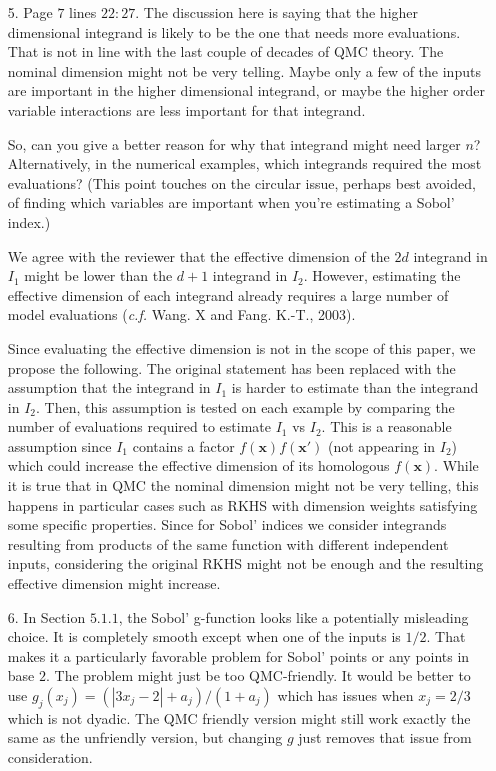\documentclass[10pt,a4paper]{article}
\newcommand{\vect}[1]{\boldsymbol{\mathbf{#1}}}
\newcommand{\vx}{\vect{x}}
\begin{document}
\begin{itemize}
\item[5.] Page $7$ lines $22:27$. The discussion here is saying that the higher dimensional integrand is likely to be the one that needs more evaluations. That is not in line with the last couple of decades of QMC theory. The nominal dimension might not be very telling. Maybe only a few of the inputs are important in the higher dimensional integrand, or maybe the higher order variable interactions are less important for that integrand.

So, can you give a better reason for why that integrand might need larger $n$? Alternatively, in the numerical examples, which integrands required the most evaluations?
(This point touches on the circular issue, perhaps best avoided, of finding which variables are important when you're estimating a Sobol' index.)

{\color{blue} We agree with the reviewer that the effective dimension of the $2d$ integrand in $I_1$ might be lower than the $d+1$ integrand in $I_2$. However, estimating the effective dimension of each integrand already requires a large number of model evaluations (\textit{c.f.} Wang. X and Fang. K.-T., 2003).

Since evaluating the effective dimension is not in the scope of this paper, we propose the following. The original statement has been replaced with the assumption that the integrand in $I_1$ is harder to estimate than the integrand in $I_2$. Then, this assumption is tested on each example by comparing the number of evaluations required to estimate $I_1$ vs $I_2$. This is a reasonable assumption since $I_1$ contains a factor $f(\vx)f(\vx')$ (not appearing in $I_2$) which could increase the effective dimension of its homologous $f(\vx)$. While it is true that in QMC the nominal dimension might not be very telling, this happens in particular cases such as RKHS with dimension weights satisfying some specific properties. Since for Sobol' indices we consider integrands resulting from products of the same function with different independent inputs, considering the original RKHS might not be enough and the resulting effective dimension might increase.}


\item[6.] In Section $5.1.1$, the Sobol' g-function looks like a potentially misleading choice. It is completely smooth except when one of the inputs is $1/2$.
That makes it a particularly favorable problem for Sobol' points or any points in base $2$. The problem might just be too QMC-friendly. It would be better to use $g_j(x_j) = (|3x_j-2| + a_j)/(1 + a_j)$ which has issues when
$x_j = 2/3$ which is not dyadic. The QMC friendly version might still work exactly the same as the unfriendly version, but changing $g$ just removes that issue from consideration.


\end{itemize}
\end{document}
